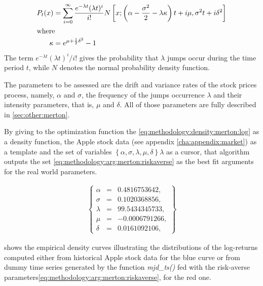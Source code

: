 \documentclass[12pt,a4paper]{report}
\begin{document}
\begin{align}
  P_t(x) &= \sum_{i=0}^{\infty} 
    \frac{e^{-\lambda t} (\lambda t)^ i}{i!}
    N\left[ 
      x;
      \left( \alpha - \frac{\sigma^2}{2} - \lambda \kappa \right) t + i \mu,
      \sigma^2 t + i\delta^2
    \right]\label{eq:methodology:density:merton:log} \\
\intertext{where}
  \kappa &= e^{\mu + \frac{1}{2} \delta^2} - 1 \notag 
\end{align}
The term $e^{-\lambda t} (\lambda t)^ i / i!$ gives the probability that $\lambda$ jumps occur during the time period $t$, while $N$ denotes the normal probability density function.

The parameters to be assessed are the drift and variance rates of the stock prices process, namely, $\alpha$ and $\sigma$, the frequency of the jumps occurrence $\lambda$ and their intensity parameters, that is, $\mu$ and $\delta$.
All of those parameters are fully described in \cref{sec:other:merton}.

By giving to the optimization function the \cref{eq:methodology:density:merton:log} as a density function, the Apple stock data (see appendix \ref{cha:appendix:market}) as a template and the set of variables 
$\left\{\alpha, \sigma, \lambda, \mu,  \delta  \right\}\lambda$ 
as a cursor, that algorithm outputs the set \ref{eq:methodology:arg:merton:riskaverse} as the best fit arguments for the real world parameters.

\begin{align}
  \left \{
  \begin{array}{lcl}
    \alpha &= &0.4816753642, \\
    \sigma &= &0.1020368856, \\
    \lambda &= &99.5434345733, \\
    \mu &= &-0.0006791266, \\
    \delta &= &0.0161092106, 
  \end{array}
  \right \}  
  \label{eq:methodology:arg:merton:riskaverse}
\end{align}


 shows the empirical density curves illustrating the distributions of the log-returns computed either from historical Apple stock data for the blue curve or from dummy time series generated by the function \textit{mjd\_ts()} fed with the risk-averse parameters\ref{eq:methodology:arg:merton:riskaverse}, for the red one.
\end{document}
